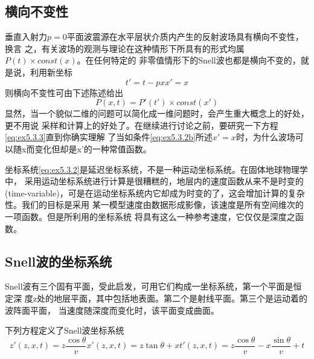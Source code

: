 \subsection{横向不变性}
\label{sec:5.3.5}

垂直入射力$p=0$平面波震源在水平层状介质内产生的反射波场具有横向不变性，换言
之，有关波场的观测与理论在这种情形下所具有的形式均属$P(t)\times const(x)$。在任何特定的
非零值情形下的Snell波也都是横向不变的，就是说，利用新坐标
\begin{subequations}
\begin{equation}
t'=t-px
\label{eq:ex5.3.2a}
\end{equation}
\begin{equation}
x'=x
\label{eq:ex5.3.2b}
\end{equation}
\label{eq:ex5.3.2}
\end{subequations}
则横向不变性可由下述陈述给出
\begin{equation}
P(x,t)=P'(t')\times const(x')
\label{eq:ex5.3.3}
\end{equation}
显然，当一个貌似二维的问题可以简化成一维问题时，会产生重大概念上的好处，更不用说
采样和计算上的好处了。在继续进行讨论之前，要研究一下方程\ref{eq:ex5.3.3}直到你确实理解
了当如条件\ref{eq:ex5.3.2b}所述$x'=x$时，为什么波场可以随x而变化但却是x'的一种常值函数。


坐标系统\ref{eq:ex5.3.2}是延迟坐标系统，不是一种运动坐标系统。在固体地球物理学中，
采用运动坐标系统进行计算是很糟糕的，地层内的速度函数从来不是时变的(time-variable)，可是在运动坐标系统内它却成为时变的了，这会增加计算的复杂性。我们的目标是采用
某一模型速度由数据形成影像，该速度是所有空间维次的一项函数。但是所利用的坐标系统
将具有这么一种参考速度，它仅仅是深度之函数。

\subsection{Snell波的坐标系统}
\label{sec:5.3.6}

Snell波有三个固有平面，受此启发，可用它们构成一坐标系统，第一个平面是恒定深
度z处的地层平面，其中包括地表面。第二个是射线平面。第三个是运动着的波阵面平面，
当速度随深度而变化时，该平面变成曲面。

下列方程定义了Snell波坐标系统
\begin{subequations}
\begin{equation}
z'(z,x,t)=z\frac{\cos\theta}{v}
\label{eq:ex5.3.4a}
\end{equation}
\begin{equation}
x'(z,x,t)=z\tan\theta+x
\label{eq:ex5.3.4b}
\end{equation}
\begin{equation}
t'(z,x,t)=z\frac{\cos\theta}{v}-x\frac{\sin\theta}{v}+t
\label{eq:ex5.3.4c}
\end{equation}
\label{eq:ex5.3.4}
\end{subequations}

